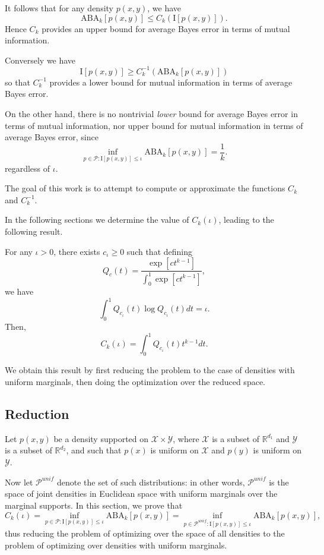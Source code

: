 It follows that for any density $p(x,
y)$, we have
\[
\text{ABA}_k[p(x,y)] \leq C_k(\text{I}[p(x,y)]).
\]
Hence $C_k$ provides an upper bound for average Bayes error in terms of mutual information.

Conversely we have
\[
\text{I}[p(x,y)] \geq C^{-1}_k(\text{ABA}_k[p(x,y)])
\]
so that $C^{-1}_k$ provides a lower bound for mutual information in terms of average Bayes error.

On the other hand, there is no nontrivial \emph{lower} bound for average Bayes error in terms of mutual information,
nor upper bound for mutual information in terms of average Bayes error, since
\[
\inf_{p \in \mathcal{P}: \text{I}[p(x,y)] \leq \iota} \text{ABA}_k[p(x,y)] = \frac{1}{k}.
\]
regardless of $\iota$.

The goal of this work is to attempt to compute or approximate the functions $C_k$ and $C_k^{-1}$.

In the following sections we determine the value of $C_k(\iota)$,
leading to the following result.

\begin{theorem}\label{theorem:Cunif}
For any $\iota > 0$, there exists $c_\iota \geq 0$ such that defining
\[
Q_c(t) = \frac{\exp[ct^{k-1}]}{\int_0^1 \exp[ct^{k-1}]},
\]
we have
\[
\int_0^1 Q_{c_\iota}(t) \log Q_{c_\iota}(t) dt = \iota.
\]
Then,
\[
C_k(\iota) = \int_0^1 Q_{c_\iota}(t) t^{k-1} dt.
\]
\end{theorem}

We obtain this result by first reducing the problem to the case of
densities with uniform marginals, then doing the optimization over the
reduced space.

\subsection{Reduction}

Let $p(x, y)$ be a density supported on
$\mathcal{X} \times \mathcal{Y}$, where $\mathcal{X}$ is a subset of
$\mathbb{R}^{d_1}$ and $\mathcal{Y}$ is a subset of
$\mathbb{R}^{d_2}$, and such that $p(x)$ is uniform on $\mathcal{X}$
and $p(y)$ is uniform on $\mathcal{Y}$.

Now let $\mathcal{P}^{unif}$ denote the set of such distributions:
in other words, $\mathcal{P}^{unif}$ is the space of joint densities in Euclidean space
with uniform marginals over the marginal supports.
In this section, we prove that
\[
C_k(\iota) =\inf_{p \in \mathcal{P}: \text{I}[p(x,y)] \leq \iota} \text{ABA}_k[p(x,y)] = 
\inf_{p \in \mathcal{P}^{unif}: \text{I}[p(x,y)] \leq \iota} \text{ABA}_k[p(x,y)],
\]
thus reducing the problem of optimizing over the space of all
densities to the problem of optimizing over densities with uniform
marginals.

